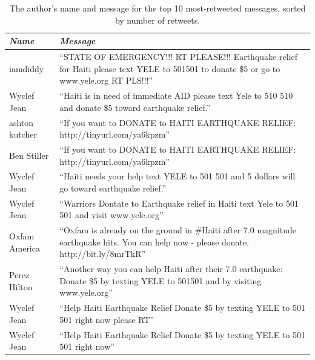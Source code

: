 \documentclass[a4paper, 11pt, titlepage]{article}
\begin{document}
\begin{center}
  \begin{table}
    \caption{The author's name and message for the top 10 most-retweeted messages, sorted by number of retweets.}
  \begin{tabular}{| l | p{9.5cm} |}
    \hline
    \textit{Name} & \textit{Message} \\
    \hline
    iamdiddy & ``STATE OF EMERGENCY!!! RT PLEASE!!! Earthquake relief for Haiti please text YELE to 501501 to donate \$5 or go to www.yele.org RT PLS!!!'' \\
    \hline
    Wyclef Jean & ``Haiti is in need of immediate AID please text Yele to 510 510 and donate \$5 toward earthquake relief.'' \\
    \hline
    ashton kutcher & ``If you want to DONATE to HAITI EARTHQUAKE RELIEF: http://tinyurl.com/ya6kpzm'' \\
    \hline
    Ben Stiller & ``If you want to DONATE to HAITI EARTHQUAKE RELIEF: http://tinyurl.com/ya6kpzm'' \\
    \hline
    Wyclef Jean & ``Haiti needs your help text YELE to 501 501 and 5 dollars will go toward earthquake relief.'' \\
    \hline
    Wyclef Jean & ``Warriors Dontate to Earthquake relief in Haiti text Yele to  501 501 and visit www.yele.org'' \\
    \hline
    Oxfam America & ``Oxfam is already on the ground in \#Haiti after 7.0 magnitude earthquake hits. You can help now - please donate. http://bit.ly/8mrTkR'' \\
    \hline
    Perez Hilton & ``Another way you can help Haiti after their 7.0 earthquake: Donate \$5 by texting YELE to 501501 and by visiting www.yele.org'' \\
    \hline
    Wyclef Jean & ``Help Haiti Earthquake Relief Donate \$5 by texting YELE to 501 501 right now please RT'' \\
    \hline
    Wyclef Jean & ``Help Haiti Earthquake Relief Donate \$5 by texting YELE to 501 501 right now'' \\
    \hline
  \end{tabular}
  \end{table}
\end{center}
\end{document}
